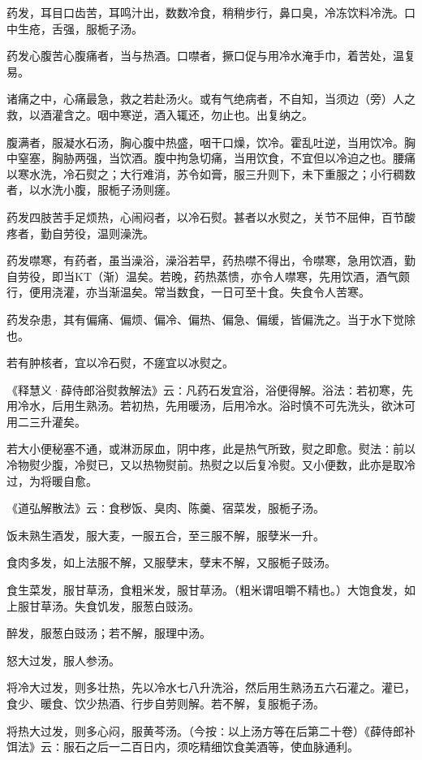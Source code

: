 \documentclass[a4paper,12pt,UTF8,twoside]{ctexbook}
\begin{document}
药发，耳目口齿苦，耳鸣汁出，数数冷食，稍稍步行，鼻口臭，冷冻饮料冷洗。口中生疮，舌强，服栀子汤。

药发心腹苦心腹痛者，当与热酒。口噤者，撅口促与用冷水淹手巾，着苦处，温复易。

诸痛之中，心痛最急，救之若赴汤火。或有气绝病者，不自知，当须边（旁）人之救，以酒灌含之。咽中寒逆，酒入辄还，勿止也。出复纳之。

腹满者，服凝水石汤，胸心腹中热盛，咽干口燥，饮冷。霍乱吐逆，当用饮冷。胸中窒塞，胸胁两强，当饮酒。腹中拘急切痛，当用饮食，不宜但以冷迫之也。腰痛以寒水洗，冷石熨之；大行难消，苏令如膏，服三升则下，未下重服之；小行稠数者，以水洗小腹，服栀子汤则瘥。

药发四肢苦手足烦热，心闹闷者，以冷石熨。甚者以水熨之，关节不屈伸，百节酸疼者，勤自劳役，温则澡洗。

药发噤寒，有药者，虽当澡浴，澡浴若早，药热噤不得出，令噤寒，急用饮酒，勤自劳役，即当KT（渐）温矣。若晚，药热蒸愦，亦令人噤寒，先用饮酒，酒气颇行，便用浇灌，亦当渐温矣。常当数食，一日可至十食。失食令人苦寒。

药发杂患，其有偏痛、偏烦、偏冷、偏热、偏急、偏缓，皆偏洗之。当于水下觉除也。

若有肿核者，宜以冷石熨，不瘥宜以冰熨之。

《释慧义·薛侍郎浴熨救解法》云∶凡药石发宜浴，浴便得解。浴法∶若初寒，先用冷水，后用生熟汤。若初热，先用暖汤，后用冷水。浴时慎不可先洗头，欲沐可用二三升灌矣。

若大小便秘塞不通，或淋沥尿血，阴中疼，此是热气所致，熨之即愈。熨法∶前以冷物熨少腹，冷熨已，又以热物熨前。热熨之以后复冷熨。又小便数，此亦是取冷过，为将暖自愈。

《道弘解散法》云∶食秽饭、臭肉、陈羹、宿菜发，服栀子汤。

饭未熟生酒发，服大麦，一服五合，至三服不解，服孽米一升。

食肉多发，如上法服不解，又服孽末，孽末不解，又服栀子豉汤。

食生菜发，服甘草汤，食粗米发，服甘草汤。（粗米谓咀嚼不精也。）大饱食发，如上服甘草汤。失食饥发，服葱白豉汤。

醉发，服葱白豉汤；若不解，服理中汤。

怒大过发，服人参汤。

将冷大过发，则多壮热，先以冷水七八升洗浴，然后用生熟汤五六石灌之。灌已，食少、暖食、饮少热酒、行步自劳则解。若不解，复服栀子汤。

将热大过发，则多心闷，服黄芩汤。（今按∶以上汤方等在后第二十卷）《薛侍郎补饵法》云∶服石之后一二百日内，须吃精细饮食美酒等，使血脉通利。
\end{document}
